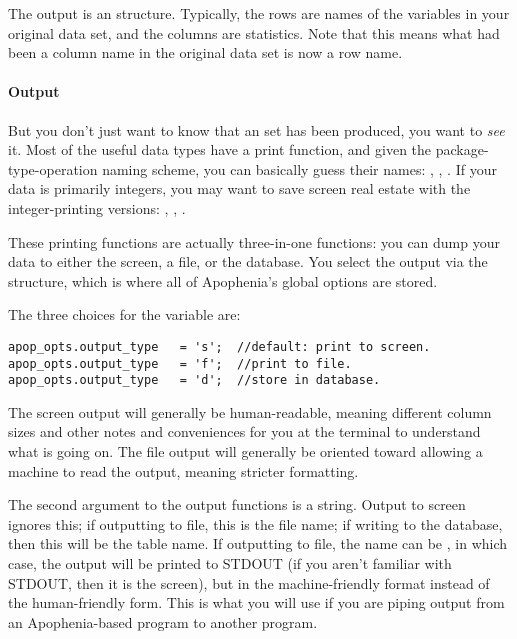 The output is an  structure. Typically, the rows are
names of the variables in your original data set, and the columns are
statistics. Note that this means what had been a column name in the 
original data set is now a row name.

\paragraph{Output} 
But you don't just want to know that an  set has been
produced, you want to {\sl see} it.  Most of the useful data types have
a print function, and given the package-type-operation naming scheme,
you can basically guess their names: ,
, . If your
data is primarily integers, you may want to save screen real estate
with the integer-printing versions: ,
, .

These printing functions are actually three-in-one functions: you can
dump your data to either the screen, a file, or the database. You select
the output via the  structure, which is where all of
Apophenia's global options are stored. 

The three choices for the  
variable are:
\begin{lstlisting}
apop_opts.output_type   = 's';  //default: print to screen.
apop_opts.output_type   = 'f';  //print to file.
apop_opts.output_type   = 'd';  //store in database.
\end{lstlisting}

The screen output will generally be human-readable, meaning different
column sizes and other notes and conveniences for you at the terminal to
understand what is going on.
The file output will generally be oriented toward allowing a machine to
read the output, meaning stricter formatting. 

The second argument to the output functions is a string.  Output to
screen ignores this; if outputting to file, this is the file name;
if writing to the database, then this will be the table name.
If outputting to file, the name can be , in which case, the
output will be printed to STDOUT (if you aren't familiar with STDOUT,
then it is the screen), but in the machine-friendly format instead of
the human-friendly form. This is what you will use if you are piping
output from an Apophenia-based program to another program.

